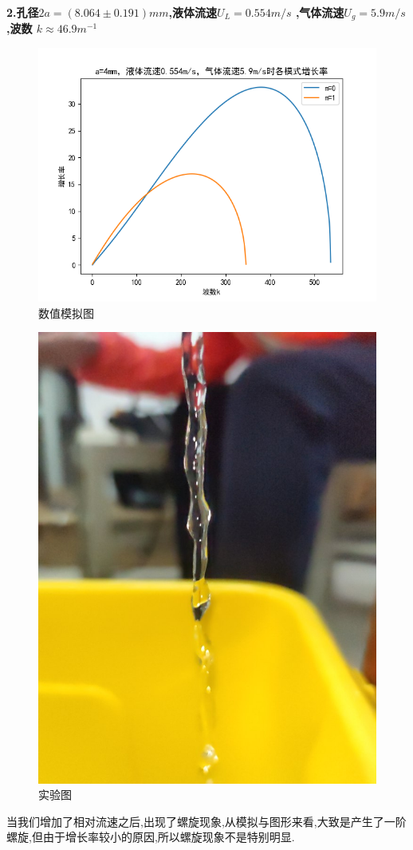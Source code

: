 \documentclass[UTF8]{gapd}
\begin{document}
\textbf{2.孔径$2a=(8.064 \pm 0.191)mm$,液体流速$U_{L}=0.554m/s$            ,气体流速$U_{g}=5.9m/s$                   ,波数 $k \approx46.9m^{-1}$}
\begin{figure}[H]
	\centering
	\includegraphics[width=0.8\linewidth]{images/59}
	\caption{数值模拟图}
	\label{fig:P22}
\end{figure}
\begin{figure}[H]
	\centering
	\includegraphics[width=0.6\linewidth]{images/5.9 2}
	\caption{实验图}
	\label{fig:P23}
\end{figure}   
当我们增加了相对流速之后,出现了螺旋现象,从模拟与图形来看,大致是产生了一阶螺旋,但由于增长率较小的原因,所以螺旋现象不是特别明显.
\end{document}
